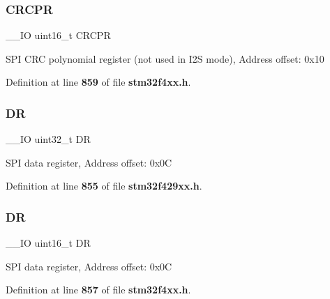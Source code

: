 \mbox{\label{structSPI__TypeDef_a942ae09a7662bad70ef336f2bed43a19}} 
\subsubsection{C\+R\+C\+PR\hspace{0.1cm}{\footnotesize\ttfamily [2/2]}}
{\footnotesize\ttfamily \+\_\+\+\_\+\+IO uint16\+\_\+t C\+R\+C\+PR}

S\+PI C\+RC polynomial register (not used in I2S mode), Address offset\+: 0x10 

Definition at line \textbf{ 859} of file \textbf{ stm32f4xx.\+h}.

\mbox{\label{structSPI__TypeDef_a3df0d8dfcd1ec958659ffe21eb64fa94}} 
\subsubsection{DR\hspace{0.1cm}{\footnotesize\ttfamily [1/2]}}
{\footnotesize\ttfamily \+\_\+\+\_\+\+IO uint32\+\_\+t DR}

S\+PI data register, Address offset\+: 0x0C 

Definition at line \textbf{ 855} of file \textbf{ stm32f429xx.\+h}.

\mbox{\label{structSPI__TypeDef_a0a1acc0425516ff7969709d118b96a3b}} 
\subsubsection{DR\hspace{0.1cm}{\footnotesize\ttfamily [2/2]}}
{\footnotesize\ttfamily \+\_\+\+\_\+\+IO uint16\+\_\+t DR}

S\+PI data register, Address offset\+: 0x0C 

Definition at line \textbf{ 857} of file \textbf{ stm32f4xx.\+h}.

\mbox{\label{structSPI__TypeDef_aa0c41c8883cb0812d6aaf956c393584b}} 
